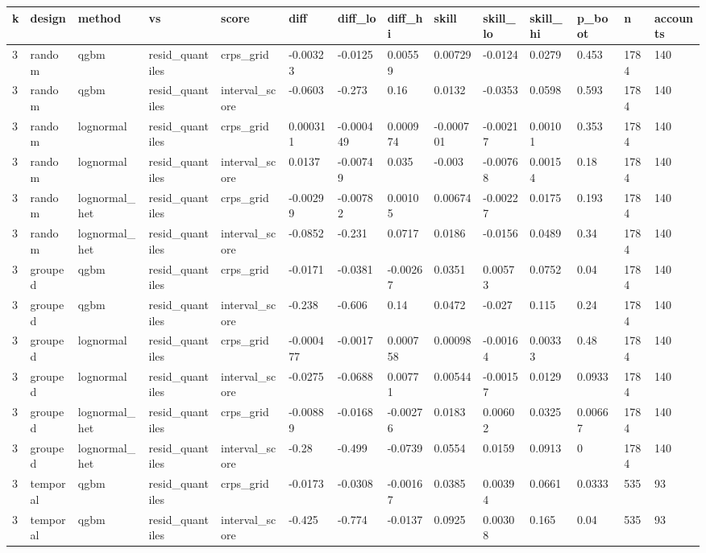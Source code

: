 \begin{tabular}{llllllllllllll}
\toprule
k & design & method & vs & score & diff & diff\_lo & diff\_hi & skill & skill\_lo & skill\_hi & p\_boot & n & accounts \\
\midrule
3 & random & qgbm & resid\_quantiles & crps\_grid & -0.00323 & -0.0125 & 0.00559 & 0.00729 & -0.0124 & 0.0279 & 0.453 & 1784 & 140 \\
3 & random & qgbm & resid\_quantiles & interval\_score & -0.0603 & -0.273 & 0.16 & 0.0132 & -0.0353 & 0.0598 & 0.593 & 1784 & 140 \\
3 & random & lognormal & resid\_quantiles & crps\_grid & 0.000311 & -0.000449 & 0.000974 & -0.000701 & -0.00217 & 0.00101 & 0.353 & 1784 & 140 \\
3 & random & lognormal & resid\_quantiles & interval\_score & 0.0137 & -0.00749 & 0.035 & -0.003 & -0.00768 & 0.00154 & 0.18 & 1784 & 140 \\
3 & random & lognormal\_het & resid\_quantiles & crps\_grid & -0.00299 & -0.00782 & 0.00105 & 0.00674 & -0.00227 & 0.0175 & 0.193 & 1784 & 140 \\
3 & random & lognormal\_het & resid\_quantiles & interval\_score & -0.0852 & -0.231 & 0.0717 & 0.0186 & -0.0156 & 0.0489 & 0.34 & 1784 & 140 \\
3 & grouped & qgbm & resid\_quantiles & crps\_grid & -0.0171 & -0.0381 & -0.00267 & 0.0351 & 0.00573 & 0.0752 & 0.04 & 1784 & 140 \\
3 & grouped & qgbm & resid\_quantiles & interval\_score & -0.238 & -0.606 & 0.14 & 0.0472 & -0.027 & 0.115 & 0.24 & 1784 & 140 \\
3 & grouped & lognormal & resid\_quantiles & crps\_grid & -0.000477 & -0.0017 & 0.000758 & 0.00098 & -0.00164 & 0.00333 & 0.48 & 1784 & 140 \\
3 & grouped & lognormal & resid\_quantiles & interval\_score & -0.0275 & -0.0688 & 0.00771 & 0.00544 & -0.00157 & 0.0129 & 0.0933 & 1784 & 140 \\
3 & grouped & lognormal\_het & resid\_quantiles & crps\_grid & -0.00889 & -0.0168 & -0.00276 & 0.0183 & 0.00602 & 0.0325 & 0.00667 & 1784 & 140 \\
3 & grouped & lognormal\_het & resid\_quantiles & interval\_score & -0.28 & -0.499 & -0.0739 & 0.0554 & 0.0159 & 0.0913 & 0 & 1784 & 140 \\
3 & temporal & qgbm & resid\_quantiles & crps\_grid & -0.0173 & -0.0308 & -0.00167 & 0.0385 & 0.00394 & 0.0661 & 0.0333 & 535 & 93 \\
3 & temporal & qgbm & resid\_quantiles & interval\_score & -0.425 & -0.774 & -0.0137 & 0.0925 & 0.00308 & 0.165 & 0.04 & 535 & 93 \\

\end{tabular}

